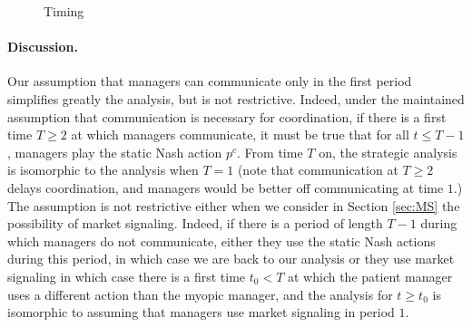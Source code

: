 \documentclass[]{article}
\begin{document}
\begin{figure}[htbh]
\centering
{}
\caption{Timing}
\label{fig:timing}
\end{figure}
%
\paragraph{Discussion.} Our assumption that managers can communicate only in the first period simplifies greatly the analysis, but is not restrictive. Indeed, under the maintained assumption that communication is necessary for coordination, if there is a first time $T\geq 2$ at which managers communicate, it must be true that for all $t\leq T-1$, managers play the static Nash action $p^c$. From time $T$ on, the strategic analysis is isomorphic to the analysis when $T=1$ (note that communication at $T\geq 2$ delays coordination, and managers would be better off communicating at time $1$.) The assumption is not restrictive either when we consider in Section \ref{sec:MS} the possibility of market signaling. Indeed, if there is a period of length $T-1$ during which managers do not communicate, either they use the static Nash actions during this period, in which case we are back to our analysis or they use market signaling in which case there is a first time $t_0<T$ at which the patient manager uses a different action than the myopic manager, and the analysis for $t\geq t_0$ is isomorphic to assuming that managers use market signaling in period $1$.
\end{document}

